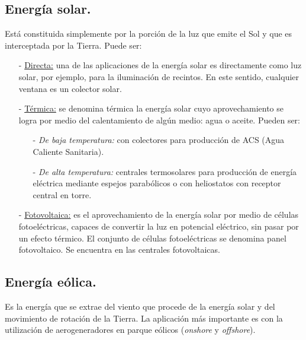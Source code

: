 			\subsection{Energía solar.}
				Está constituida simplemente por la porción de la luz que emite el Sol y que es	interceptada por la Tierra. Puede ser:
				\begin{itemize}
					\item[-] \underline{Directa:}
						una de las aplicaciones de la energía solar es directamente como luz solar, por ejemplo, para la iluminación de recintos. En este sentido, cualquier ventana es un colector solar.
					\item[-] \underline{Térmica:}
						se denomina térmica la energía solar cuyo aprovechamiento se logra por medio del
						calentamiento de algún medio: agua o aceite. Pueden ser:
						\begin{itemize}
							\item[-] \textit{De baja temperatura:} 
								con colectores para producción de ACS (Agua Caliente Sanitaria).
							\item[-] \textit{De alta temperatura:} 
								centrales termosolares para producción de energía eléctrica mediante espejos parabólicos o con heliostatos con receptor central en torre.
						\end{itemize}
					\item[-] \underline{Fotovoltaica:}
						es el aprovechamiento de la energía solar por medio de células fotoeléctricas,
						capaces de convertir la luz en potencial eléctrico, sin pasar por un efecto térmico. El conjunto de
						células fotoeléctricas se denomina panel fotovoltaico. Se encuentra en las centrales fotovoltaicas.
				\end{itemize}
				
			\subsection{Energía eólica.}
				Es la energía que se extrae del viento que procede de la energía solar y del movimiento de rotación
				de la Tierra. La aplicación más importante es con la utilización de aerogeneradores en parque eólicos (\textit{onshore} y \textit{offshore}).
